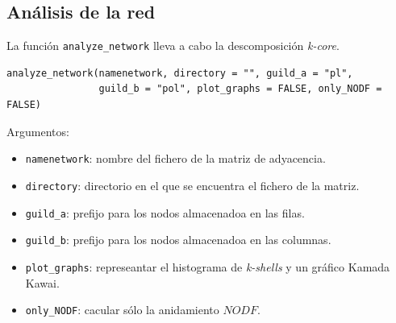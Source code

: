 \subsection*{Análisis de la red}
\label{network_analysis}

La función \texttt{analyze\_network} lleva a cabo la descomposición \textit{k-core}.

\fontsize{3.5mm}{3.5mm}\selectfont
\begin{verbatim}
analyze_network(namenetwork, directory = "", guild_a = "pl",
                guild_b = "pol", plot_graphs = FALSE, only_NODF = FALSE)
\end{verbatim}
\normalsize

Argumentos:
\small
\begin{itemize}

\item \texttt{namenetwork}: nombre del fichero de la matriz de adyacencia.
	
\item \texttt{directory}: directorio en el que se encuentra el fichero de la matriz.

\item \texttt{guild\_a}: prefijo para los nodos almacenadoa en las filas.

\item \texttt{guild\_b}: prefijo para los nodos almacenadoa en las columnas.

\item \texttt{plot\_graphs}: represeantar el histograma de \textit{k-shells} y un gráfico Kamada Kawai.

\item \texttt{only\_NODF}: cacular sólo la anidamiento $NODF$.

\end{itemize}

